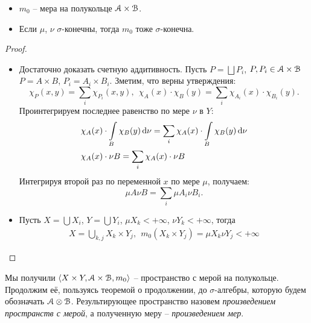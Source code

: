 \begin{theorem}
    \enewline
    \begin{itemize}
        \item $m_0$ -- мера на полукольце $\mathcal{A} \times \mathcal{B}$.
        \item Если $\mu$, $\nu$ $\sigma$-конечны, тогда $m_0$ тоже $\sigma$-конечна.
    \end{itemize} 
\end{theorem}
\begin{proof}
    \enewline
    \begin{itemize}
        \item Достаточно доказать счетную аддитивность. Пусть $P = \bigsqcup{P_i}$, $P, P_i \in \mathcal{A} \times \mathcal{B}$
            $P = A \times B$, $P_i = A_i \times B_i$. Зметим, что верны утверждения:
            \[
                \chi_P(x, y) = \sum_{i}{\chi_{P_i}(x, y)},~~
                \chi_A(x) \cdot \chi_B(y) = \sum_{i}{\chi_{A_i}(x) \cdot \chi_{B_i}(y)}
            .\]            
            Проинтегрируем последнее равенство по мере $\nu$ в $Y$:
            \begin{align*}
            &\chi_A(x) \cdot \int\limits_B{\chi_B(y) \,\mathrm{d}\nu} = \sum_{i}{\chi_A(x) \cdot \int\limits_B{\chi_B(y) \,\mathrm{d}\nu}} \\
            &\chi_A(x) \cdot \nu{B} = \sum_{i}{\chi_A(x) \cdot \nu{B}}
            \end{align*}
            Интегрируя второй раз по переменной $x$ по мере $\mu$, получаем:
            \[
                \mu{A} \nu{B} = \sum_{i}{\mu{A_i} \nu{B_i}}
            .\]
        \item Пусть $X = \bigcup{X_i}$, $Y = \bigcup{Y_i}$, $\mu{X_k} < +\infty$, $\nu{Y_k} < +\infty$, 
            тогда 
            \begin{align*}
                X = \bigcup_{k, j}{X_k \times Y_j},~~ m_0(X_k \times Y_j) = \mu{X_k} \nu{Y_j} < +\infty
            \end{align*}
    \end{itemize}
\end{proof}

\begin{definition}

    Мы получили $\langle X \times Y, \mathcal{A} \times \mathcal{B}, m_0 \rangle$ -- пространство с
    мерой на полукольце. Продолжим её, пользуясь теоремой о продолжении,
    до $\sigma$-алгебры, которую будем обозначать $\mathcal{A} \otimes \mathcal{B}$. Результирующее пространство
    назовем \textit{произведением пространств с мерой}, а полученную меру -- \textit{произведением мер}.
\end{definition}

